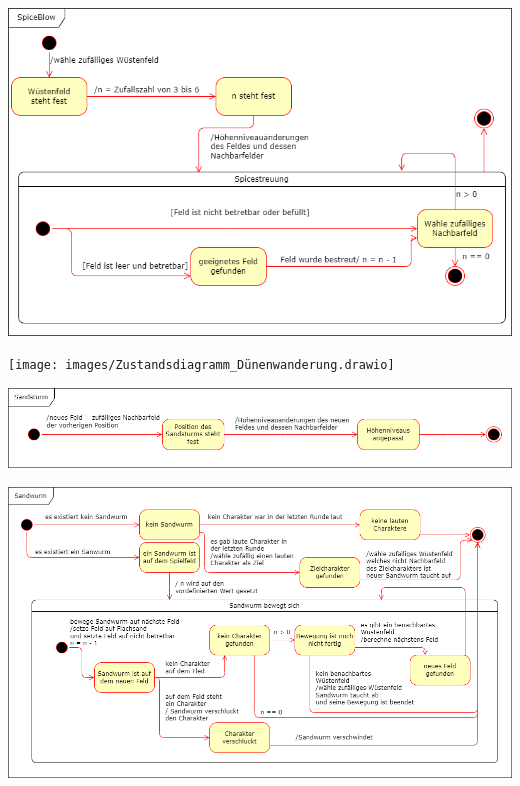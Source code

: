 \documentclass{uulm-assignment}
\newcounter{fa}
\begin{document}
\includegraphics[width=\textwidth]{images/Zustandsdiagramm_SpiceBlow.drawio}
\label{fig:state-mashine-spiceblow}

\texttt{[image: images/Zustandsdiagramm\_Dünenwanderung.drawio]}
\label{fig:state-mashine-dunechanging}

\includegraphics[width=\textwidth]{images/Zustandsdiagramm_SandSturm.drawio}
\label{fig:state-mashine-sandstorm}

\includegraphics[width=\textwidth]{images/Zustandsdiagramm_SandWurm.drawio}
\label{fig:state-mashine-sandworm}
\end{document}
